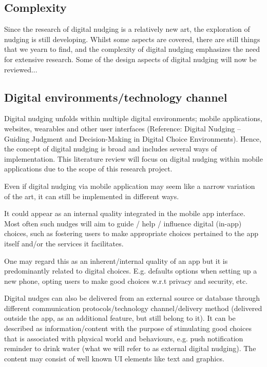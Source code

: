 
\subsection{Complexity}
Since the research of digital nudging is a relatively new art, the exploration of nudging is still developing. Whilst some aspects are covered, there are still things that we yearn to find, and the complexity of digital nudging emphasizes the need for extensive research. Some of the design aspects of digital nudging will now be reviewed...

\subsection{Digital environments/technology channel}
Digital nudging unfolds within multiple digital environments; mobile applications, websites, wearables and other user interfaces (Reference: Digital Nudging – Guiding Judgment and Decision-Making in Digital Choice Environments). Hence, the concept of digital nudging is broad and includes several ways of implementation. This literature review will focus on digital nudging within mobile applications due to the scope of this research project. 

Even if digital nudging via mobile application may seem like a narrow variation of the art, it can still be implemented in different ways. 

It could appear as an internal quality integrated in the mobile app interface. Most often such nudges will aim to guide / help / influence digital (in-app) choices, such as fostering users to make appropriate choices pertained to the app itself and/or the services it facilitates. 

One may regard this as an inherent/internal quality of an app but it is predominantly related to digital choices. E.g. defaults options when setting up a new phone, opting users to make good choices w.r.t privacy and security, etc.

Digital nudges can also be delivered from an external source or database through different communication protocols/technology channel/delivery method (delivered outside the app, as an additional feature, but still belong to it). It can be described as information/content with the purpose of stimulating good choices that is associated with physical world and behaviours, e.g. push notification reminder to drink water (what we will refer to as external digital nudging). The content may consist of well known UI elements like text and graphics. 

